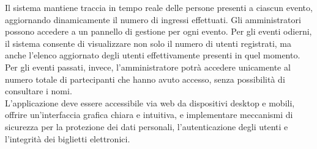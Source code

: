 \noindent Il sistema mantiene traccia in tempo reale delle persone presenti a ciascun evento, aggiornando dinamicamente il numero di ingressi effettuati. Gli amministratori possono accedere a un pannello di gestione per ogni evento. Per gli eventi odierni, il sistema consente di visualizzare non solo il numero di utenti registrati, ma anche l’elenco aggiornato degli utenti effettivamente presenti in quel momento. Per gli eventi passati, invece, l’amministratore potrà accedere unicamente al numero totale di partecipanti che hanno avuto accesso, senza possibilità di consultare i nomi.\\

\noindent L’applicazione deve essere accessibile via web da dispositivi desktop e mobili, offrire un’interfaccia grafica chiara e intuitiva, e implementare meccanismi di sicurezza per la protezione dei dati personali, l’autenticazione degli utenti e l’integrità dei biglietti elettronici.


